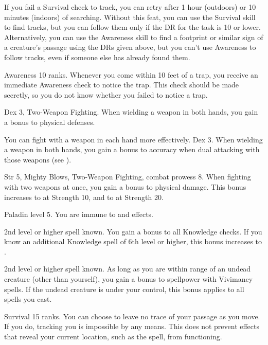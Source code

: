 If you fail a Survival check to track, you can retry after 1 hour (outdoors) or 10 minutes (indoors) of searching.
Without this feat, you can use the Survival skill to find tracks, but you can follow them only if the DR for the task is 10 or lower.
Alternatively, you can use the Awareness skill to find a footprint or similar sign of a creature's passage using the DRs given above, but you can't use Awareness to follow tracks, even if someone else has already found them.

\featpre Awareness 10 ranks.
\featben Whenever you come within 10 feet of a trap, you receive an immediate Awareness check to notice the trap.
This check should be made secretly, so you do not know whether you failed to notice a trap.

\featpres Dex 3, Two-Weapon Fighting.
\featben When wielding a weapon in both hands, you gain a  bonus to physical defenses.

You can fight with a weapon in each hand more effectively.
\featpre Dex 3.
\featben When wielding a weapon in both hands, you gain a  bonus to accuracy when dual attacking with those weapons (see ).

\featpres Str 5, Mighty Blows, Two-Weapon Fighting, combat prowess 8.
\featben When fighting with two weapons at once, you gain a  bonus to physical damage.
This bonus increases to  at Strength 10, and to  at Strength 20.

\featpre Paladin level 5.
\featben You are immune to  and  effects.

\featpre 2nd level or higher  spell known.
\featben You gain a  bonus to all Knowledge checks.
If you know an additional Knowledge spell of 6th level or higher, this bonus increases to .

\featpre 2nd level or higher  spell known.
\featben As long as you are within \rngclose range of an undead creature (other than yourself), you gain a  bonus to spellpower with Vivimancy spells.
If the undead creature is under your control, this bonus applies to all spells you cast.

\featpre Survival 15 ranks.
\featben You can choose to leave no trace of your passage as you move.
If you do, tracking you is impossible by any means.
This does not prevent effects that reveal your current location, such as the  spell, from functioning.

